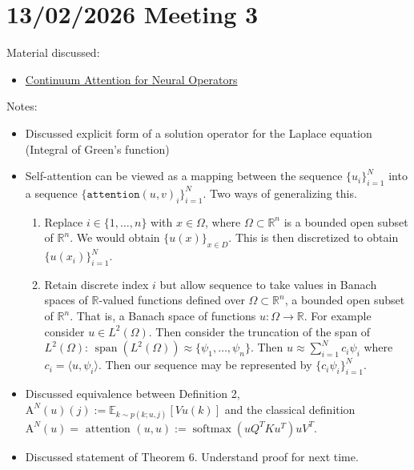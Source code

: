 \documentclass{article}
\begin{document}
\section{13/02/2026 Meeting 3}
Material discussed:
\begin{itemize}
    \item \href{https://arxiv.org/abs/2406.06486}{Continuum Attention for Neural Operators}
\end{itemize}
Notes:
\begin{itemize}
    \item Discussed explicit form of a solution operator for the Laplace equation (Integral of Green's function)
    \item Self-attention can be viewed as a mapping between the sequence $\{u_i\}_{i=1}^N$ into a sequence \newline $\{\texttt{attention}(u,v)_i \}_{i=1}^N$. Two ways of generalizing this.
    \begin{enumerate}
        \item Replace $i \in \{1,\ldots,n\}$ with $x \in \Omega$, where $\Omega \subset \mathbb R^n$ is a bounded open subset of $\mathbb R^n$. We would obtain $\{u(x)\}_{x \in D}$. This is then discretized to obtain $\{u(x_i) \}_{i=1}^N$.
        \item Retain discrete index $i$ but allow sequence to take values in Banach spaces of $\mathbb R$-valued functions defined over $\Omega \subset \mathbb R^n$, a bounded open subset of $\mathbb R^n$. That is, a Banach space of functions $u:\Omega \to \mathbb R$.
        For example consider $u \in L^2(\Omega)$. Then consider the truncation of the span of $L^2(\Omega)$: $\operatorname{span}(L^2(\Omega))\approx\{\psi_1,\ldots,\psi_n\}$.
        Then $u\approx \sum_{i=1}^N c_i \psi_i$ where $c_i = \langle u, \psi_i \rangle$. Then our sequence may be represented by $\{c_i\psi_i\}_{i=1}^N$.
    \end{enumerate}
    \item Discussed equivalence between Definition 2, $\mathrm{A}^N(u)(j):=\mathbb{E}_{k \sim p(k ; u, j)}[V u(k)]$ and the classical definition $\mathrm{A}^N(u)=\text { attention }(u, u):=\operatorname{softmax}\left(u Q^T K u^T\right) u V^T$.
    \item Discussed statement of Theorem 6. Understand proof for next time.
\end{itemize}
\end{document}
